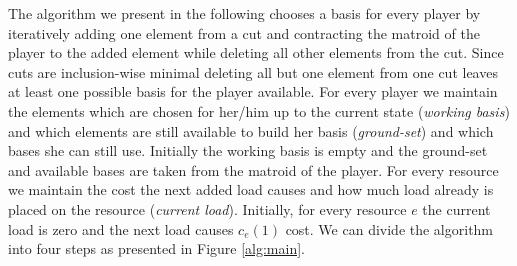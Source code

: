 \documentclass{scrartcl}
\theoremstyle{nonumberplain}
\begin{document}
The algorithm we present in the following chooses a basis for every player by
iteratively adding one element from a cut and contracting the matroid of the
player to the added element while deleting all other elements from the cut.
Since cuts are inclusion-wise minimal deleting all but one element from one cut
leaves at least one possible basis for the player available. For every player
we maintain the elements which are chosen for her/him up to the current state
(\emph{working basis}) and which elements are still available to build her
basis (\emph{ground-set}) and which bases she can still use. Initially the
working basis is empty and the ground-set and available bases are taken from
the matroid of the player. For every resource we maintain the cost the next
added load causes and how much load already is placed on the resource
(\emph{current load}). Initially, for every resource $e$ the current
load is zero and the next load causes $c_{e}(1)$ cost. We can divide the
algorithm into four steps as presented in Figure \ref{alg:main}.
\end{document}
